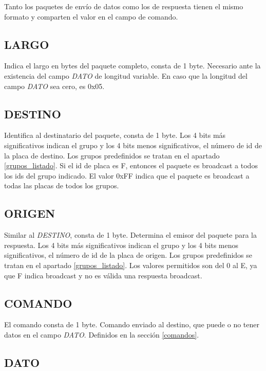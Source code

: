 \documentclass[a4paper,10pt]{article}
\begin{document}
Tanto los paquetes de env\'io de datos como los de respuesta tienen el mismo formato y comparten el valor en el campo de comando.

\subsection{LARGO}
\label{largo}

	Indica el largo en bytes del paquete completo, consta de 1 byte.
	Necesario ante la existencia del campo \emph{DATO} de longitud variable.
	En caso que la longitud del campo \emph{DATO} sea cero, es 0x05.

\subsection{DESTINO}
\label{tipo_destinatario}

	Identifica al destinatario del paquete, consta de 1 byte.
	Los 4 bits m\'as significativos indican el grupo y los 4 bits menos significativos, el n\'umero de id de la placa de destino.
	Los grupos predefinidos se tratan en el apartado \ref{grupos_listado}.
	Si el id de placa es F, entonces el paquete es broadcast a todos los ids del grupo indicado.
	El valor 0xFF indica que el paquete es broadcast a todas las placas de todos los grupos.

\subsection{ORIGEN}
\label{tipo_emisor}

	Similar al \emph{DESTINO}, consta de 1 byte.
	Determina el emisor del paquete para la respuesta.
	Los 4 bits m\'as significativos indican el grupo y los 4 bits menos significativos, el n\'umero de id de la placa de origen.
	Los grupos predefinidos se tratan en el apartado \ref{grupos_listado}.
	Los valores permitidos son del 0 al E, ya que F indica broadcast y no es v\'alida una respuesta broadcast.

\subsection{COMANDO}
\label{comando}

	El comando consta de 1 byte.
	Comando enviado al destino, que puede o no tener datos en el campo \emph{DATO}.
	Definidos en la secci\'on \ref{comandos}.


\subsection{DATO}
\label{dato}
\end{document}
